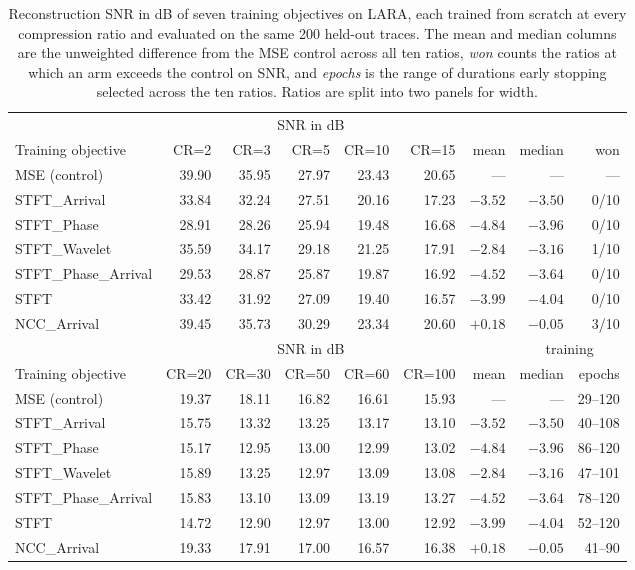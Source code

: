 \documentclass[fleqn,10pt]{wlscirep}
\begin{document}
\begin{table}[!t]
\centering
\small
\caption{Reconstruction SNR in dB of seven training objectives on LARA, each trained from scratch at every compression ratio and evaluated on the same 200 held-out traces. The mean and median columns are the unweighted difference from the MSE control across all ten ratios, \emph{won} counts the ratios at which an arm exceeds the control on SNR, and \emph{epochs} is the range of durations early stopping selected across the ten ratios. Ratios are split into two panels for width.}
\label{tab:loss-ablation}
\begin{tabular}{lrrrrrrrr}
\toprule
& \multicolumn{5}{c}{SNR in dB} & & & \\
Training objective & CR=2 & CR=3 & CR=5 & CR=10 & CR=15 & mean & median & won \\
\midrule
MSE (control)       & 39.90 & 35.95 & 27.97 & 23.43 & 20.65 & ---    & ---    & ---    \\
STFT\_Arrival        & 33.84 & 32.24 & 27.51 & 20.16 & 17.23 & $-3.52$ & $-3.50$ & 0/10 \\
STFT\_Phase          & 28.91 & 28.26 & 25.94 & 19.48 & 16.68 & $-4.84$ & $-3.96$ & 0/10 \\
STFT\_Wavelet        & 35.59 & 34.17 & 29.18 & 21.25 & 17.91 & $-2.84$ & $-3.16$ & 1/10 \\
STFT\_Phase\_Arrival & 29.53 & 28.87 & 25.87 & 19.87 & 16.92 & $-4.52$ & $-3.64$ & 0/10 \\
STFT                & 33.42 & 31.92 & 27.09 & 19.40 & 16.57 & $-3.99$ & $-4.04$ & 0/10 \\
NCC\_Arrival         & 39.45 & 35.73 & 30.29 & 23.34 & 20.60 & $+0.18$ & $-0.05$ & 3/10 \\
\midrule
& \multicolumn{5}{c}{SNR in dB} & & \multicolumn{2}{c}{training} \\
Training objective & CR=20 & CR=30 & CR=50 & CR=60 & CR=100 & mean & median & epochs \\
\midrule
MSE (control)       & 19.37 & 18.11 & 16.82 & 16.61 & 15.93 & ---    & ---    & 29--120 \\
STFT\_Arrival        & 15.75 & 13.32 & 13.25 & 13.17 & 13.10 & $-3.52$ & $-3.50$ & 40--108 \\
STFT\_Phase          & 15.17 & 12.95 & 13.00 & 12.99 & 13.02 & $-4.84$ & $-3.96$ & 86--120 \\
STFT\_Wavelet        & 15.89 & 13.25 & 12.97 & 13.09 & 13.08 & $-2.84$ & $-3.16$ & 47--101 \\
STFT\_Phase\_Arrival & 15.83 & 13.10 & 13.09 & 13.19 & 13.27 & $-4.52$ & $-3.64$ & 78--120 \\
STFT                & 14.72 & 12.90 & 12.97 & 13.00 & 12.92 & $-3.99$ & $-4.04$ & 52--120 \\
NCC\_Arrival         & 19.33 & 17.91 & 17.00 & 16.57 & 16.38 & $+0.18$ & $-0.05$ & 41--90 \\
\bottomrule
\end{tabular}
\end{table}
\end{document}
